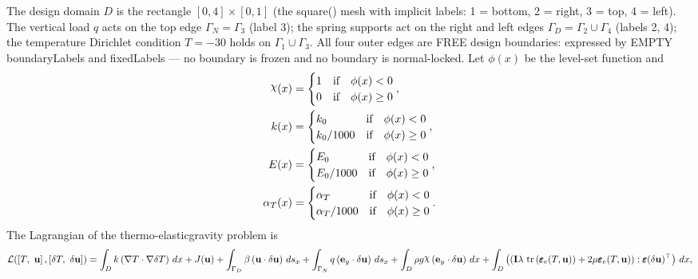 \documentclass[preview]{standalone}
\let\oldcdot\cdot
\let\cdot\oldcdot
\begin{document}
The design domain $D$ is the rectangle $[0,4]\times[0,1]$ (the square() mesh with implicit labels: 1 = bottom, 2 = right, 3 = top, 4 = left).  The vertical load $q$ acts on the top edge $\Gamma_{N}=\Gamma_{3}$ (label 3); the spring supports act on the right and left edges $\Gamma_{D}=\Gamma_{2}\cup\Gamma_{4}$ (labels 2, 4); the temperature Dirichlet condition $T=-30$ holds on $\Gamma_{1}\cup\Gamma_{3}$.  All four outer edges are FREE design boundaries: expressed by EMPTY boundaryLabels and fixedLabels — no boundary is frozen and no boundary is normal-locked.
Let $\phi(x)$ be the level-set function and
 \begin{align*}\raisebox{\depth}{$\chi$}(x) &= \begin{cases} 1 & \mbox{if}\quad \phi(x) < 0 \\ 0 & \mbox{if}\quad \phi(x)  \ge 0 \end{cases},\\
k(x) &= \begin{cases} k_0 & \mbox{if}\quad \phi(x) < 0 \\ k_0/1000 & \mbox{if}\quad \phi(x)  \ge 0 \end{cases},\\
E(x) &= \begin{cases} E_0 & \mbox{if}\quad \phi(x) < 0 \\ E_0/1000 & \mbox{if}\quad \phi(x)  \ge 0 \end{cases},\\
\alpha_{T}(x) &= \begin{cases} \alpha_T & \mbox{if}\quad \phi(x) < 0 \\ \alpha_T/1000 & \mbox{if}\quad \phi(x)  \ge 0 \end{cases}.\end{align*}
The Lagrangian of the thermo-elasticgravity problem is
\begin{dmath*}
\mathcal L(\left[ T, \  {\mathbf{ u }}\right],\left[ \delta T, \  {\delta\mathbf{  u }}\right]) =  \int_{D} k \left(  \nabla T  \cdot  \nabla \delta T  \right) \,dx + J({\mathbf{ u }}) +  \int_{\Gamma_D} \beta \left( {\mathbf{ u }} \cdot {\delta\mathbf{  u }} \right) \,ds_x +  \int_{\Gamma_N} q \left( \mathbf e_y \cdot {\delta\mathbf{  u }} \right) \,ds_x +  \int_{D} \rho g \raisebox{\depth}{$\chi$} \left( \mathbf e_y \cdot {\delta\mathbf{  u }} \right) \,dx +  \int_{D} \left( \left( \mathbf{I} \lambda  \,\operatorname{tr}\left(\pmb\varepsilon_{e}(T,{\mathbf{ u }})\right)  + 2 \mu \pmb\varepsilon_{e}(T,{\mathbf{ u }}) \right) \mathrel{:}  \pmb\varepsilon({\delta\mathbf{  u }})^\top  \right) \,dx , 
\end{dmath*}
\end{document}
